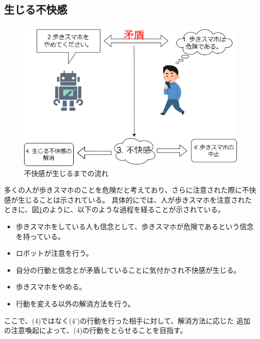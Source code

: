 \documentclass[11pt,a4j]{jreport}
\begin{document}
\subsection{生じる不快感}
\label{sec: dissonance}
\begin{figure}[htbp]
  
  \includegraphics[width=13cm]{img/CDT.png}
  \caption{不快感が生じるまでの流れ}
  \label{fig: dissonance}
\end{figure}

多くの人が歩きスマホのことを危険だと考えており、さらに注意された際に不快感が生じることは示されている\cite{Schneider2022}。
具体的に\cite{Schneider2022}では、人が歩きスマホを注意されたときに、図\ref{fig: dissonance}のように、以下のような過程を経ることが示されている。
\begin{itemize}
  \item[(1)] 歩きスマホをしている人も信念として、歩きスマホが危険であるという信念を持っている。
  \item[(2)] ロボットが注意を行う。
  \item[(3)] 自分の行動と信念とが矛盾していることに気付かされ不快感が生じる。
  \item[(4)] 歩きスマホをやめる。
  \item[(4')] 行動を変える以外の解消方法を行う。 
  \label{item: dissonance}
\end{itemize}
ここで、(4)ではなく(4')の行動を行った相手に対して、解消方法に応じた
追加の注意喚起によって、(4)の行動をとらせることを目指す。
\end{document}
